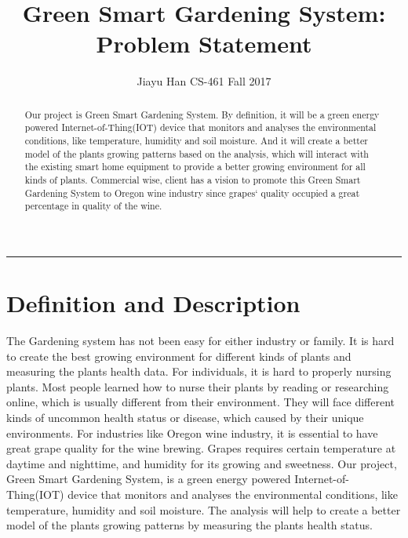 \documentclass[letterpaper, fleqn, 10pt, onecolumn,singlespace]{article}
\title{Green Smart Gardening System: \newline Problem Statement}
\author{Jiayu Han CS-461  Fall 2017}
\begin{document}
\maketitle
\hrule

\begin{abstract}
	Our project is Green Smart Gardening System. By definition, it will be a green energy powered Internet-of-Thing(IOT) device that monitors and analyses the environmental conditions, like temperature, humidity and soil moisture. And it will create a better model of the plants growing patterns based on the analysis, which will interact with the existing smart home equipment to provide a better growing environment for all kinds of plants. Commercial wise, client has a vision to promote this Green Smart Gardening System to Oregon wine industry since grapes` quality occupied a great percentage in quality of the wine. 
\end{abstract}

\pagebreak

\section*{Definition and Description}
	The Gardening system has not been easy for either industry or family. It is hard to create the best growing environment for different kinds of plants and measuring the plants health data. For individuals, it is hard to properly nursing plants. Most people learned how to nurse their plants by reading or researching online, which is usually different from their environment. They will face different kinds of uncommon health status or disease, which caused by their unique environments. For industries like Oregon wine industry, it is essential to have great grape quality for the wine brewing.  Grapes requires certain temperature at daytime and nighttime, and humidity for its growing and sweetness. 
\newline
	Our project, Green Smart Gardening System, is a green energy powered Internet-of-Thing(IOT) device that monitors and analyses the environmental conditions, like temperature, humidity and soil moisture. The analysis will help to create a better model of the plants growing patterns by measuring the plants health status. 
\end{document}
